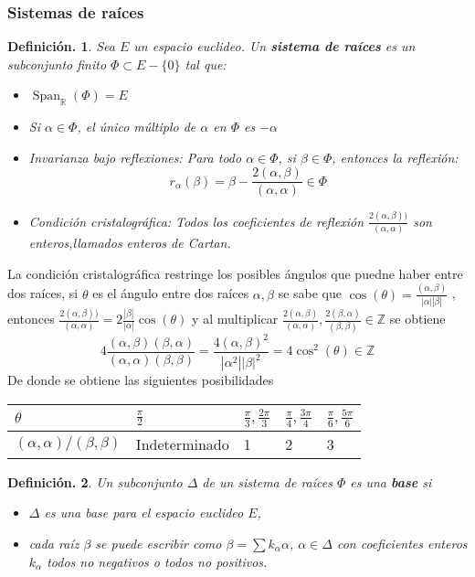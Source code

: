 \documentclass[11pt,a4paper]{article}
\newtheorem{definition}{Definici\'on.}
\newcommand{\Span}{\operatorname{Span}}
\begin{document}
\subsubsection{Sistemas de raíces}
\begin{definition}
Sea $E$ un espacio euclideo. Un \textbf{sistema de raíces} es un subconjunto finito $\Phi \subset E- \{ 0\}$  tal que:
\begin{itemize}
    \item $\Span_{\mathbb{R}}(\Phi)=E$
    \item Si $\alpha \in \Phi$, el único múltiplo de $\alpha$ en $\Phi$ es $-\alpha$
    \item Invarianza bajo reflexiones: Para todo  $\alpha \in \Phi$, si $\beta \in \Phi$, entonces la reflexión:
    $$r_{\alpha}(\beta)=\beta - \frac{2(\alpha,\beta)}{(\alpha,\alpha)} \in \Phi$$
    \item  Condición cristalográfica: Todos los coeficientes de reflexión $\frac{2(\alpha,\beta))}{(\alpha,\alpha)}$ son enteros,llamados enteros de Cartan.
\end{itemize}

\end{definition}
La condición cristalográfica restringe los posibles ángulos que puedne haber entre dos raíces, si $\theta$ es el ángulo entre dos raíces $\alpha, \beta$ se sabe que $\cos (\theta)=\frac{(\alpha, \beta)}{|\alpha||\beta|}$ , entonces $\frac{2(\alpha,\beta))}{(\alpha,\alpha)}= 2 \frac{|\beta|}{|\alpha|}\cos(\theta)$ y  al multiplicar $\frac{2(\alpha, \beta)}{(\alpha, \alpha)} ,\frac{2(\beta, \alpha)}{(\beta, \beta)}  \in \mathbb{Z}$ se obtiene
$$4\frac{(\alpha, \beta)(\beta, \alpha)}{(\alpha, \alpha)(\beta,\beta)}=\frac{4(\alpha, \beta)^2}{|\alpha^2||\beta|^2}= 4\cos^2 (\theta) \in \mathbb{Z} $$
De donde se obtiene las siguientes posibilidades
\begin{table}[h]
\centering
\begin{tabular}{|l|l|l|l|l|}
\hline
$\theta $                         & $\frac{\pi}{2}$ & $\frac{\pi}{3},\frac{2\pi}{3}$ & $\frac{\pi}{4},\frac{3\pi}{4}$ & $\frac{\pi}{6},\frac{5\pi}{6}$ \\ \hline
$(\alpha, \alpha)/ (\beta,\beta)$ & Indeterminado   & 1                              & 2                              & 3                              \\ \hline
\end{tabular}
\end{table}
\begin{definition}
Un subconjunto $\Delta$ de un sistema de raíces $\Phi$ es una \textbf{base} si
\begin{itemize}
    \item $\Delta$ es una base para el espacio euclideo $E$,
    \item cada raíz $\beta$ se puede escribir como $\beta= \sum k_{\alpha}\alpha$, $\alpha\in \Delta$ con coeficientes enteros $k_{\alpha}$ todos no negativos o todos no positivos.
\end{itemize}
\end{definition}
\end{document}
